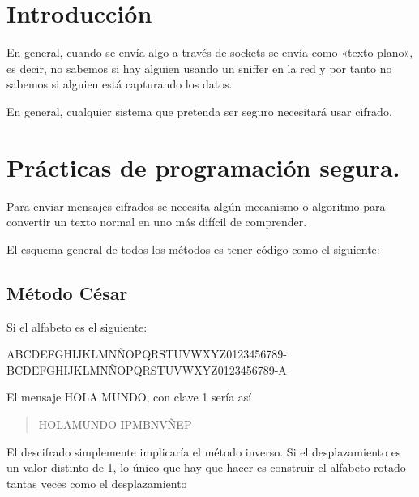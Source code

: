 \documentclass[letterpaper,10pt,spanish]{sphinxmanual}
\begin{document}
\section{Introducción}
\label{\detokenize{textos/tema5:introduccion}}
En general, cuando se envía algo a través de sockets se envía como «texto plano», es decir, no sabemos si hay alguien usando un sniffer en la red y por tanto no sabemos si alguien está capturando los datos.

En general, cualquier sistema que pretenda ser seguro necesitará usar cifrado.


\section{Prácticas de programación segura.}
\label{\detokenize{textos/tema5:practicas-de-programacion-segura}}
Para enviar mensajes cifrados se necesita algún mecanismo o algoritmo para convertir un texto normal en uno más difícil de comprender.

El esquema general de todos los métodos es tener código como el siguiente:

%
\begin{sphinxVerbatim}[commandchars=\\\{\}]
      

    
\end{sphinxVerbatim}


\subsection{Método César}
\label{\detokenize{textos/tema5:metodo-cesar}}
Si el alfabeto es el siguiente:

ABCDEFGHIJKLMNÑOPQRSTUVWXYZ0123456789-
BCDEFGHIJKLMNÑOPQRSTUVWXYZ0123456789-A

El mensaje HOLA MUNDO, con clave 1 sería así
\begin{quote}

HOLAMUNDO
IPMBNVÑEP
\end{quote}

El descifrado simplemente implicaría el método inverso. Si el desplazamiento es un valor distinto de 1, lo único que hay que hacer es construir el alfabeto rotado tantas veces como el desplazamiento
\end{document}
